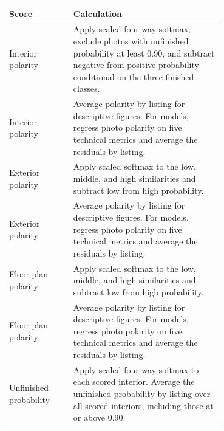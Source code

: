 \begin{tabular}{lp{0.70\linewidth}}
\toprule
Score & Calculation \\
\midrule
Interior polarity & Apply scaled four-way softmax, exclude photos with unfinished probability at least 0.90, and subtract negative from positive probability conditional on the three finished classes. \\
Interior polarity & Average polarity by listing for descriptive figures. For models, regress photo polarity on five technical metrics and average the residuals by listing. \\
Exterior polarity & Apply scaled softmax to the low, middle, and high similarities and subtract low from high probability. \\
Exterior polarity & Average polarity by listing for descriptive figures. For models, regress photo polarity on five technical metrics and average the residuals by listing. \\
Floor-plan polarity & Apply scaled softmax to the low, middle, and high similarities and subtract low from high probability. \\
Floor-plan polarity & Average polarity by listing for descriptive figures. For models, regress photo polarity on five technical metrics and average the residuals by listing. \\
Unfinished probability & Apply scaled four-way softmax to each scored interior. Average the unfinished probability by listing over all scored interiors, including those at or above 0.90. \\
\bottomrule
\end{tabular}
